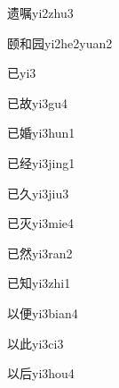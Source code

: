 \begin{verbete}[12;15]{遗嘱}{yi2zhu3}
\end{verbete}

\begin{verbete*}[13;8;7]{颐和园}{yi2he2yuan2}
\end{verbete*}

\begin{verbete}[3]{已}{yi3}
\end{verbete}

\begin{verbete}[3;9]{已故}{yi3gu4}
\end{verbete}

\begin{verbete}[3;11]{已婚}{yi3hun1}
\end{verbete}

\begin{verbete}[3;8]{已经}{yi3jing1}
\end{verbete}

\begin{verbete}[3;3]{已久}{yi3jiu3}
\end{verbete}

\begin{verbete}[3;5]{已灭}{yi3mie4}
\end{verbete}

\begin{verbete}[3;5]{已然}{yi3ran2}
\end{verbete}

\begin{verbete}[3;8]{已知}{yi3zhi1}
\end{verbete}

\begin{verbete}[4;9]{以便}{yi3bian4}
\end{verbete}

\begin{verbete}[4;6]{以此}{yi3ci3}
\end{verbete}

\begin{verbete}[4;6]{以后}{yi3hou4}
\end{verbete}

